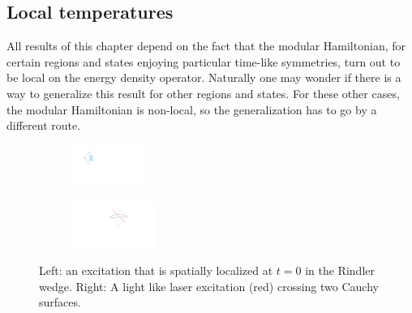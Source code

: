 \documentclass[12pt]{article}
\numberwithin{equation}{section}
\begin{document}
\subsection{Local temperatures}

All results of this chapter depend on the fact that the modular Hamiltonian, for certain regions and states enjoying particular time-like symmetries, turn out to be local on the energy density operator. Naturally one may wonder if there is a way to generalize this result for other regions and states. For these other cases, the modular Hamiltonian is non-local, so the generalization has to go by a different route. 

\begin{figure}[t]  
\begin{subfigure}
\centering
\hspace{1.3cm}\includegraphics[width=0.26\textwidth]{uno.pdf}
\end{subfigure}
\hspace{2cm}
\begin{subfigure}
\centering
\includegraphics[width=0.3\textwidth]{dos.pdf}
\end{subfigure}
\captionsetup{width=0.9\textwidth}
\caption{Left: an excitation that is spatially localized at $t=0$ in the Rindler wedge. Right: A light like laser excitation (red) crossing two Cauchy surfaces.}
\label{rayo}
\end{figure}  
\end{document}
